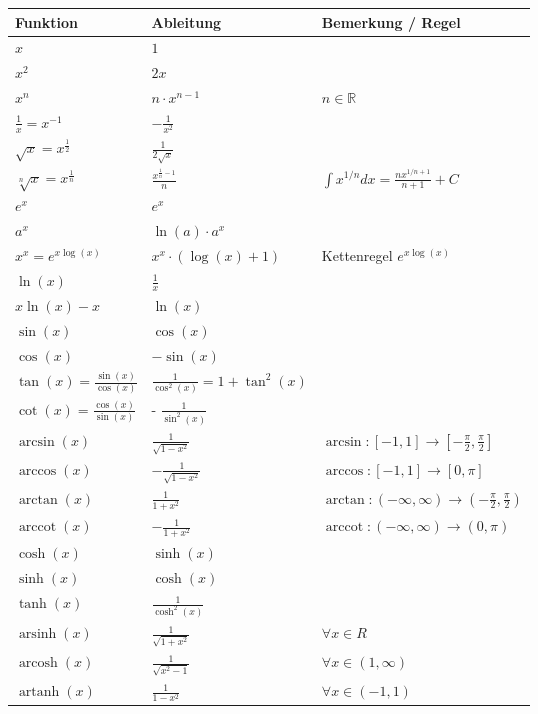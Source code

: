 \documentclass[25pt]{sciposter}
\newcommand{\R}{\mathbb{R}}
\begin{document}
\begin{multicols}{3}
{\renewcommand{\arraystretch}{1.5}
	\begin{table}[]
		\begin{tabular}{@{} p{} p{} p{} @{}}
			\toprule
			Funktion & Ableitung & Bemerkung / Regel\\ \midrule
			$x$ & $1$ &   \\
			$x^2$& $2x$ &   \\
			$x^n$& $n\cdot x^{n-1}$ & $n \in \R$  \\
			$\frac{1}{x} = x^{-1}$ & $- \frac{1}{x^2}$ & \\
			$\sqrt{x} = x^{\frac{1}{2}}$ & $\frac{1}{2\sqrt{x}}$ & \\ 
			$\sqrt[n]{x} = x^{\frac{1}{n}}$ & $\frac{x^{\frac{1}{n} -1 }}{n}$ &  $\int x^{1/n} dx = \frac{n x^{1/n + 1}}{n+1} + C$\\ 
			$e^x$ & $e^x$ & \\
			$a^x$ & $\ln(a) \cdot a^x$& \\
			$x^x = e^{x\log(x)}$ & $x^x \cdot (\log(x) + 1)$ & Kettenregel $e^{x\log(x)}$\\
			$\ln(x)$ & $\frac{1}{x}$ & \\
			$x\ln(x) - x$ & $\ln(x)$ &  \\ \midrule
			$\sin(x)$ & $\cos(x)$ & \\
			$\cos(x)$ & $- \sin(x)$ & \\ 
			$\tan(x) = \frac{\sin(x)}{\cos(x)}$ & $\frac{1}{\cos^2(x)} = 1 + \tan^2(x)$ &\\
			$\cot(x) = \frac{\cos(x)}{\sin(x)}$ & - $\frac{1}{\sin^2(x)}$ & \\ 
			$\arcsin(x)$ & $\frac{1}{\sqrt{1 - x^2}}$ & $ \arcsin : [-1,1] \to [-\frac{\pi}{2},\frac{\pi}{2}]$\\
			$\arccos(x)$ & $ - \frac{1}{\sqrt{1-x^2}}$ & $\arccos : [-1,1] \to [0, \pi]$\\
			$\arctan(x)$ & $\frac{1}{1+x^2}$ & $\arctan:(-\infty, \infty) \to (- \frac{\pi}{2},\frac{\pi}{2})$\\
			$\operatorname{arccot}(x)$ & $ - \frac{1}{1+x^2} $ & $\operatorname{arccot} : (-\infty, \infty) \to (0,\pi)$\\
			\midrule
			$\cosh(x)$ & $\sinh(x)$ &\\
			$\sinh(x)$ & $\cosh(x)$ & \\
			$\tanh(x)$ & $\frac{1}{\cosh^2(x)}$ & \\
			$\operatorname{arsinh}(x)$ & $\frac{1}{\sqrt{1+x^2}}$ & $\forall x \in R$\\
			$\operatorname{arcosh}(x)$ & $\frac{1}{\sqrt{x^2 - 1}}$ & $\forall x \in (1, \infty)$\\		  $\operatorname{artanh}(x)$ & $\frac{1}{1-x^2}$ & $\forall x \in (-1,1)$\\

\end{tabular}
\end{table}}
\end{multicols}
\end{document}
